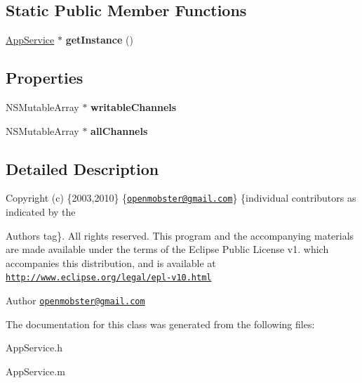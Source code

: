 \subsection*{\-Static \-Public \-Member \-Functions}
\begin{DoxyCompactItemize}
\item 
\hypertarget{interface_app_service_a904c829c0d68b5f746c167671b312e0e}{
\hyperlink{interface_app_service}{\-App\-Service} $\ast$ {\bfseries get\-Instance} ()}
\label{interface_app_service_a904c829c0d68b5f746c167671b312e0e}

\end{DoxyCompactItemize}
\subsection*{\-Properties}
\begin{DoxyCompactItemize}
\item 
\hypertarget{interface_app_service_a3c6ebf6a086faf3a74b8ada51d594a50}{
\-N\-S\-Mutable\-Array $\ast$ {\bfseries writable\-Channels}}
\label{interface_app_service_a3c6ebf6a086faf3a74b8ada51d594a50}

\item 
\hypertarget{interface_app_service_ab72e2a3fbfd51e894cd1784db66f3cc8}{
\-N\-S\-Mutable\-Array $\ast$ {\bfseries all\-Channels}}
\label{interface_app_service_ab72e2a3fbfd51e894cd1784db66f3cc8}

\end{DoxyCompactItemize}


\subsection{\-Detailed \-Description}
\-Copyright (c) \{2003,2010\} \{\href{mailto:openmobster@gmail.com}{\tt openmobster@gmail.\-com}\} \{individual contributors as indicated by the \begin{DoxyAuthor}{\-Authors}
tag\}. \-All rights reserved. \-This program and the accompanying materials are made available under the terms of the \-Eclipse \-Public \-License v1. which accompanies this distribution, and is available at \href{http://www.eclipse.org/legal/epl-v10.html}{\tt http\-://www.\-eclipse.\-org/legal/epl-\/v10.\-html}
\end{DoxyAuthor}
\begin{DoxyAuthor}{\-Author}
\href{mailto:openmobster@gmail.com}{\tt openmobster@gmail.\-com} 
\end{DoxyAuthor}


\-The documentation for this class was generated from the following files\-:\begin{DoxyCompactItemize}
\item 
\-App\-Service.\-h\item 
\-App\-Service.\-m\end{DoxyCompactItemize}
